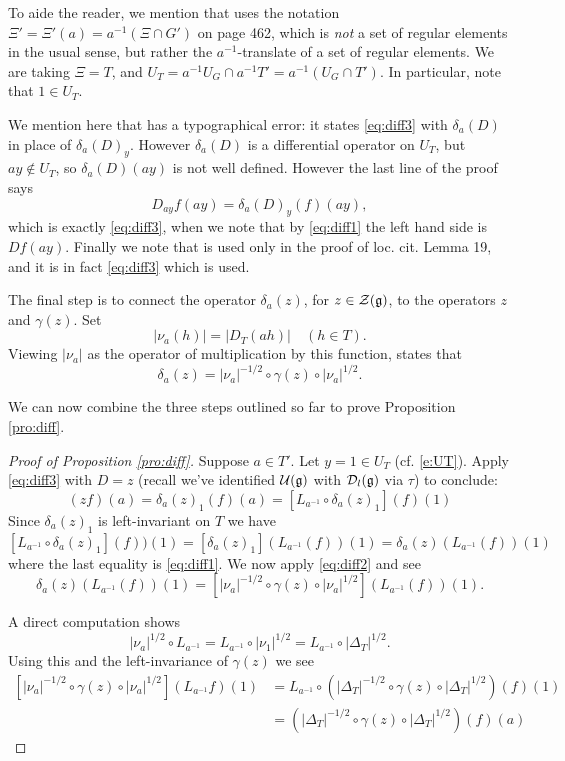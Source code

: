 \documentclass{article}
\theoremstyle{definition}
\numberwithin{equation}{section}
\renewcommand{\-}{\hyp{}}
\newcommand{\g}{\mathfrak g}
\begin{document}
To aide the reader, we mention that \cite[Lemma 18]{HC_inv_eigen} uses the notation $\Xi'=\Xi'(a)=a^{-1}(\Xi\cap G')$ on page 462, which is \emph{not} a set of regular elements in the usual sense, but rather the $a^{-1}$-translate of a set of regular elements. We are taking $\Xi=T$, and $U_T=a^{-1}U_G \cap a^{-1}T'=a^{-1}(U_G\cap T')$. In particular, note that $1 \in U_T$.


We mention here that  \cite[Lemma 18]{HC_inv_eigen} has a typographical error: it states \eqref{eq:diff3} with $\delta_a(D)$ in place of
$\delta_a(D)_y$.  However $\delta_a(D)$ is a differential operator on $U_T$, but $ay\not\in U_T$, so $\delta_a(D)(ay)$ is not well defined.
However the last line of the proof  says
\[ D_{ay}f(ay) = \delta_a(D)_y(f)(ay), \]
which is exactly \eqref{eq:diff3}, when we note that by \eqref{eq:diff1}  the left hand side is $Df(ay)$.
Finally we note that \cite[Lemma 18]{HC_inv_eigen} is used only in the proof of loc. cit. Lemma 19, and it is in fact \eqref{eq:diff3} which is used.



The final step is to connect the operator $\delta_a(z)$, for $z \in \mathcal{Z}(\mathfrak{g})$, to the operators $z$ and $\gamma(z)$.
Set 
\[
|\nu_a(h)| = |D_T(ah)|\quad(h\in T).
\]
Viewing $|\nu_a|$ as the operator of multiplication by this function, 
\cite[\S6, Lemma 13]{HC_inv_eigen} states that
\begin{equation} \label{eq:diff2}
\delta_a(z) = |\nu_a|^{-1/2} \circ \gamma(z) \circ |\nu_a|^{1/2}.
\end{equation}

We can now combine the three steps outlined so far to prove Proposition \ref{pro:diff}.
\begin{proof}[Proof of Proposition \ref{pro:diff}]
Suppose $a\in T'$. Let $y=1\in U_T$ (cf. \eqref{e:UT}). Apply \eqref{eq:diff3} with $D=z$ 
(recall we've identified $\mc{U}(\g)$ with $\mc{D}_l(\g)$ via $\tau$)
to conclude:
\[
 (zf)(a) = \delta_a(z)_1(f)(a) =[L_{a^{-1}}\circ\delta_a(z)_1](f)(1)
\]
Since $\delta_a(z)_1$ is left-invariant on $T$ we have
\[
[L_{a^{-1}}\circ\delta_a(z)_1](f))(1)=[\delta_a(z)_1](L_{a^{-1}}(f))(1)=\delta_a(z)(L_{a^{-1}}(f))(1)
\]
where the last equality is \eqref{eq:diff1}.
We now apply \eqref{eq:diff2} and see
\[ \delta_a(z)(L_{a^{-1}}(f))(1) = [|\nu_a|^{-1/2} \circ \gamma(z) \circ |\nu_a|^{1/2}](L_{a^{-1}}(f))(1). 
\]

A direct computation shows 
$$
|\nu_a|^{1/2} \circ L_{a^{-1}}=L_{a^{-1}} \circ |\nu_1|^{1/2}=L_{a^{-1}} \circ |\Delta_T|^{1/2}.
$$
Using this and the left-invariance of $\gamma(z)$ we see 
\[ 
\begin{aligned}
[|\nu_a|^{-1/2} \circ \gamma(z) \circ |\nu_a|^{1/2}](L_{a^{-1}}f)(1) &= L_{a^{-1}}\circ(|\Delta_T|^{-1/2} \circ \gamma(z) \circ |\Delta_T|^{1/2})(f)(1)\\
&=(|\Delta_T|^{-1/2} \circ \gamma(z) \circ |\Delta_T|^{1/2})(f)(a)
\end{aligned}
\]

\end{proof}
\end{document}
